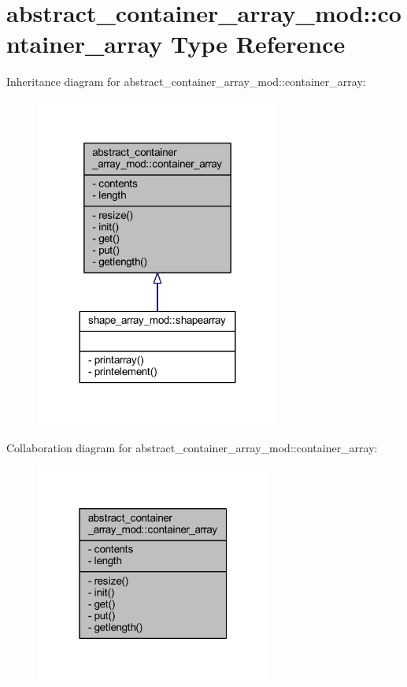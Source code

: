 \hypertarget{structabstract__container__array__mod_1_1container__array}{}\section{abstract\+\_\+container\+\_\+array\+\_\+mod\+:\+:container\+\_\+array Type Reference}
\label{structabstract__container__array__mod_1_1container__array}


Inheritance diagram for abstract\+\_\+container\+\_\+array\+\_\+mod\+:\+:container\+\_\+array\+:
\nopagebreak
\begin{figure}[H]
\begin{center}
\leavevmode
\includegraphics[width=228pt]{structabstract__container__array__mod_1_1container__array__inherit__graph}
\end{center}
\end{figure}


Collaboration diagram for abstract\+\_\+container\+\_\+array\+\_\+mod\+:\+:container\+\_\+array\+:
\nopagebreak
\begin{figure}[H]
\begin{center}
\leavevmode
\includegraphics[width=220pt]{structabstract__container__array__mod_1_1container__array__coll__graph}
\end{center}
\end{figure}
